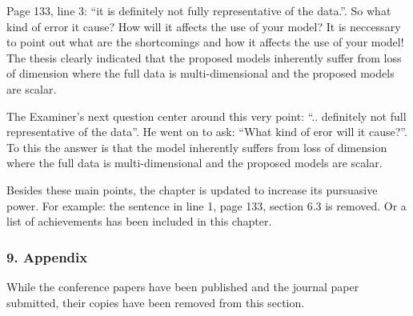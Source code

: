 \replyToComment
    {Page 133, line 3: ``it is definitely not fully representative of the data.''.
      So what kind of error it cause?
      How will it affects the use of your model?
      It is neccessary to point out what are the shortcomings and how it affects the use of your model!
    }
    {
      The thesis clearly indicated that the proposed models inherently suffer from loss of dimension where the full data is multi-dimensional and the proposed models are scalar.
}
    
The Examiner's next question center around this very point: ``.. definitely not full representative of the data''.
He went on to ask: ``What kind of eror will it cause?''.
To this the answer is that the model inherently suffers from loss of dimension
  where the full data is multi-dimensional and the proposed models are scalar.

Besides these main points, the chapter is updated to increase its pursuasive power.
For example: the sentence in line 1, page 133, section 6.3 is removed.
Or a list of achievements has been included in this chapter.

\subsubsection*{9. Appendix}

While the conference papers have been published and the journal paper submitted,
  their copies have been removed from this section.



